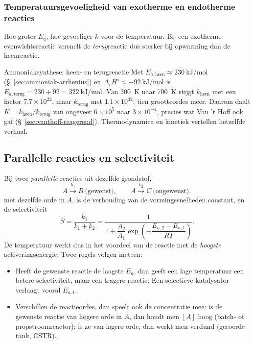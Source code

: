 \subsubsection{Temperatuursgevoeligheid van exotherme en endotherme reacties}
\label{sec:temperatuursgevoeligheid}

Hoe groter $E_a$, hoe gevoeliger $k$ voor de temperatuur. Bij een exotherme evenwichtsreactie versnelt de \emph{terug}reactie dus sterker bij opwarming dan de heenreactie.

\begin{voorbeeld}{Ammoniaksynthese: heen- en terugreactie}
Met $E_{a,\text{heen}} \approx \SI{230}{\kilo\joule\per\mole}$ (\S~\ref{sec:ammoniak-arrhenius}) en $\Delta_rH^\circ \approx \SI{-92}{\kilo\joule\per\mole}$ is $E_{a,\text{terug}} = 230 + 92 = \SI{322}{\kilo\joule\per\mole}$. Van \SI{300}{\kelvin} naar \SI{700}{\kelvin} stijgt $k_\text{heen}$ met een factor $7.7\times10^{22}$, maar $k_\text{terug}$ met $1.1\times10^{32}$: tien grootteordes meer. Daarom daalt $K = k_\text{heen}/k_\text{terug}$ van ongeveer $6\times10^5$ naar $3\times10^{-4}$, precies wat Van 't Hoff ook gaf (\S~\ref{sec:vanthoff-reagerend}). Thermodynamica en kinetiek vertellen hetzelfde verhaal.
\end{voorbeeld}

\subsection{Parallelle reacties en selectiviteit}
\label{sec:selectiviteit}

Bij twee \emph{parallelle} reacties uit dezelfde grondstof,
\[
A \xrightarrow{k_1} B \ \text{(gewenst)}, \qquad A \xrightarrow{k_2} C \ \text{(ongewenst)},
\]
met dezelfde orde in $A$, is de verhouding van de vormingssnelheden constant, en de selectiviteit
\begin{equation}
S = \frac{k_1}{k_1 + k_2} = \frac{1}{1 + \dfrac{A_2}{A_1}\exp\!\left(-\dfrac{E_{a,2} - E_{a,1}}{RT}\right)}.
\label{eq:selectiviteit}
\end{equation}
De temperatuur werkt dus in het voordeel van de reactie met de \emph{hoogste} activeringsenergie. Twee regels volgen meteen:
\begin{itemize}
\item Heeft de gewenste reactie de laagste $E_a$, dan geeft een lage temperatuur een betere selectiviteit, maar een tragere reactie. Een selectieve katalysator verlaagt vooral $E_{a,1}$.
\item Verschillen de reactieordes, dan speelt ook de concentratie mee: is de gewenste reactie van hogere orde in $A$, dan houdt men $[A]$ hoog (batch- of propstroomreactor); is ze van lagere orde, dan werkt men verdund (geroerde tank, CSTR).
\end{itemize}

